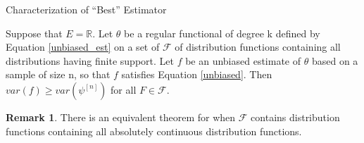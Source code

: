 \documentclass{beamer}
\newcommand{\R}{{\mathbb{R}}}
\theoremstyle{definition}
\numberwithin{Def}{section}
\newtheorem{Rmk}{Remark}
\begin{document}
\begin{frame}{Characterization of ``Best'' Estimator}
 \begin{theorem}
    Suppose that $E = \R$. Let $\theta$ be a regular functional of degree k defined by Equation \ref{unbiased_est} on a set of $\mathcal{F}$ of distribution functions containing all distributions having finite support. Let $f$ be an unbiased estimate of $\theta$ based on a sample of size n, so that $f$ satisfies Equation \ref{unbiased}. Then $var(f) \geq var(\psi^{[n]})$ for all $F \in \mathcal{F}$. 
    \end{theorem}



  \pause   
     \begin{Rmk}
 There is an equivalent theorem for when $\mathcal{F}$ contains distribution functions containing all absolutely continuous distribution functions. 
 \end{Rmk}
\end{frame}
\end{document}
